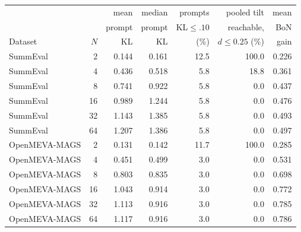 \begin{tabular}{lrrrrrr}
\toprule
 &  & mean & median & prompts & pooled tilt & mean \\
 &  & prompt & prompt & KL$\le.10$ & reachable, & BoN \\
Dataset & $N$ & KL & KL & (\%) & $d\le0.25$ (\%) & gain \\
\midrule
SummEval & 2 & 0.144 & 0.161 & 12.5 & 100.0 & 0.226 \\
SummEval & 4 & 0.436 & 0.518 & 5.8 & 18.8 & 0.361 \\
SummEval & 8 & 0.741 & 0.922 & 5.8 & 0.0 & 0.437 \\
SummEval & 16 & 0.989 & 1.244 & 5.8 & 0.0 & 0.476 \\
SummEval & 32 & 1.143 & 1.385 & 5.8 & 0.0 & 0.493 \\
SummEval & 64 & 1.207 & 1.386 & 5.8 & 0.0 & 0.497 \\
\midrule
OpenMEVA-MAGS & 2 & 0.131 & 0.142 & 11.7 & 100.0 & 0.285 \\
OpenMEVA-MAGS & 4 & 0.451 & 0.499 & 3.0 & 0.0 & 0.531 \\
OpenMEVA-MAGS & 8 & 0.803 & 0.835 & 3.0 & 0.0 & 0.698 \\
OpenMEVA-MAGS & 16 & 1.043 & 0.914 & 3.0 & 0.0 & 0.772 \\
OpenMEVA-MAGS & 32 & 1.113 & 0.916 & 3.0 & 0.0 & 0.785 \\
OpenMEVA-MAGS & 64 & 1.117 & 0.916 & 3.0 & 0.0 & 0.786 \\
\bottomrule
\end{tabular}
